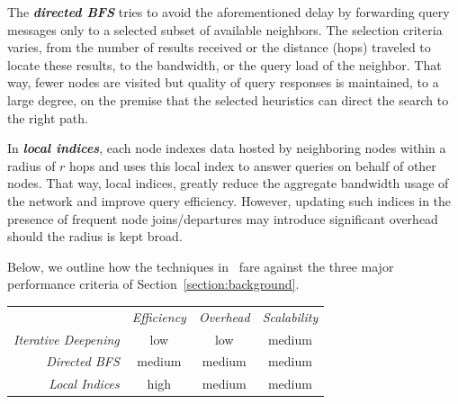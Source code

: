 The \textbf{\emph{directed BFS}}
tries to avoid the aforementioned delay by forwarding 
query messages only to a selected subset of available neighbors. The selection
criteria varies, from the number of results received or the distance (hops)
traveled to locate these results, to the bandwidth, or the
query load of the neighbor. That way, fewer nodes are visited but quality of
query responses is maintained, to a large degree, on the premise that the
selected heuristics can direct the search to the right path.

In \textbf{\emph{local indices}},
each node indexes data hosted by neighboring nodes within a radius of $r$ hops
and uses this local index to answer queries on behalf of other nodes.
That way, local indices,
greatly reduce the aggregate bandwidth usage of the network and 
improve query efficiency. However, updating such indices in 
the presence of frequent node joins/departures 
may introduce significant overhead should the radius is kept broad.

Below, we outline how the techniques in~\cite{YG-M2002}
fare against the three major performance criteria 
of Section~\ref{section:background}.

\begin{center}
{\footnotesize
\begin{tabular}{rccc}
\multicolumn{1}{r}{} &
\multicolumn{1}{c}{\emph{Efficiency}} &
\multicolumn{1}{c}{\emph{Overhead}} &
\multicolumn{1}{c}{\emph{Scalability}}
\\
\cline{2-4}
\emph{Iterative Deepening} &
low &
low &
% 
medium \\
\emph{Directed BFS} &
medium &
medium &
medium \\
\emph{Local Indices} &
high &
medium &
medium \\
\end{tabular}
}
\end{center}

